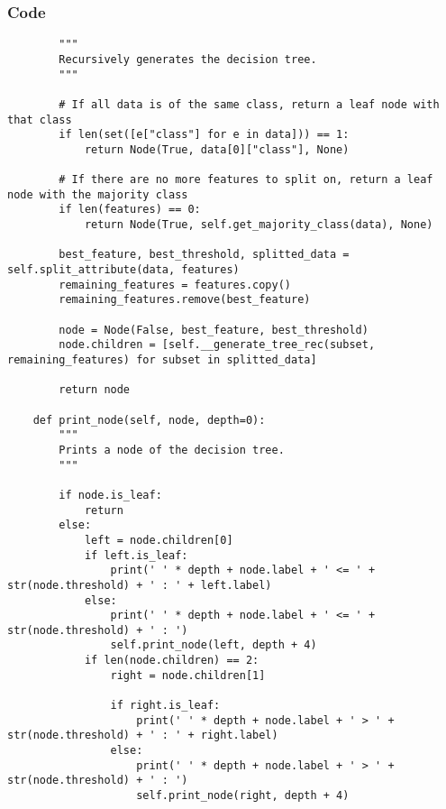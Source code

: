 \documentclass{beamer}
\begin{document}
\begin{frame}[fragile]
    \frametitle{Code}
    \fontsize{3pt}{5pt}\selectfont
    \begin{verbatim}
        """
        Recursively generates the decision tree.
        """
        
        # If all data is of the same class, return a leaf node with that class
        if len(set([e["class"] for e in data])) == 1:
            return Node(True, data[0]["class"], None)
        
        # If there are no more features to split on, return a leaf node with the majority class
        if len(features) == 0:
            return Node(True, self.get_majority_class(data), None)
        
        best_feature, best_threshold, splitted_data = self.split_attribute(data, features)
        remaining_features = features.copy()
        remaining_features.remove(best_feature)

        node = Node(False, best_feature, best_threshold)
        node.children = [self.__generate_tree_rec(subset, remaining_features) for subset in splitted_data]

        return node
    
    def print_node(self, node, depth=0):
        """
        Prints a node of the decision tree.
        """

        if node.is_leaf:
            return
        else:
            left = node.children[0]
            if left.is_leaf:
                print(' ' * depth + node.label + ' <= ' + str(node.threshold) + ' : ' + left.label)
            else:
                print(' ' * depth + node.label + ' <= ' + str(node.threshold) + ' : ')
                self.print_node(left, depth + 4)
            if len(node.children) == 2:
                right = node.children[1]

                if right.is_leaf:
                    print(' ' * depth + node.label + ' > ' + str(node.threshold) + ' : ' + right.label)
                else:
                    print(' ' * depth + node.label + ' > ' + str(node.threshold) + ' : ')
                    self.print_node(right, depth + 4)
    \end{verbatim}
\end{frame}
\end{document}
